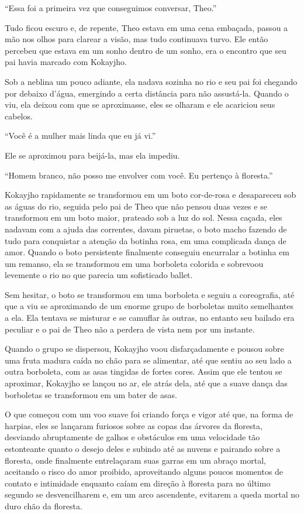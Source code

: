 ``Essa foi a primeira vez que conseguimos conversar, Theo.''

Tudo ficou escuro e, de repente, Theo estava em uma cena embaçada,
passou a mão nos olhos para clarear a visão, mas tudo continuava turvo.
Ele então percebeu que estava em um sonho dentro de um sonho, era o
encontro que seu pai havia marcado com Kokayjho.

Sob a neblina um pouco adiante, ela nadava sozinha no rio e seu pai foi
chegando por debaixo d'água, emergindo a certa distância para não
assustá-la. Quando o viu, ela deixou com que se aproximasse, eles se
olharam e ele acariciou seus cabelos.

``Você é a mulher mais linda que eu já vi.''

Ele se aproximou para beijá-la, mas ela impediu.

``Homem branco, não posso me envolver com você. Eu pertenço à
floresta.''

Kokayjho rapidamente se transformou em um boto cor-de-rosa e desapareceu
sob as águas do rio, seguida pelo pai de Theo que não pensou duas vezes
e se transformou em um boto maior, prateado sob a luz do sol. Nessa
caçada, eles nadavam com a ajuda das correntes, davam piruetas, o boto
macho fazendo de tudo para conquistar a atenção da botinha rosa, em uma
complicada dança de amor. Quando o boto persistente finalmente conseguiu
encurralar a botinha em um remanso, ela se transformou em uma borboleta
colorida e sobrevoou levemente o rio no que parecia um sofisticado
ballet.

Sem hesitar, o boto se transformou em uma borboleta e seguiu a
coreografia, até que a viu se aproximando de um enorme grupo de
borboletas muito semelhantes a ela. Ela tentava se misturar e se
camuflar às outras, no entanto seu bailado era peculiar e o pai de Theo
não a perdera de vista nem por um instante.

Quando o grupo se dispersou, Kokayjho voou disfarçadamente e pousou
sobre uma fruta madura caída no chão para se alimentar, até que sentiu
ao seu lado a outra borboleta, com as asas tingidas de fortes cores.
Assim que ele tentou se aproximar, Kokayjho se lançou no ar, ele atrás
dela, até que a suave dança das borboletas se transformou em um bater de
asas.

O que começou com um voo suave foi criando força e vigor até que, na
forma de harpias, eles se lançaram furiosos sobre as copas das árvores
da floresta, desviando abruptamente de galhos e obstáculos em uma
velocidade tão estonteante quanto o desejo deles e subindo até as nuvens
e pairando sobre a floresta, onde finalmente entrelaçaram suas garras em
um abraço mortal, aceitando o risco do amor proibido, aproveitando
alguns poucos momentos de contato e intimidade enquanto caíam em direção
à floresta para no último segundo se desvencilharem e, em um arco
ascendente, evitarem a queda mortal no duro chão da floresta.

